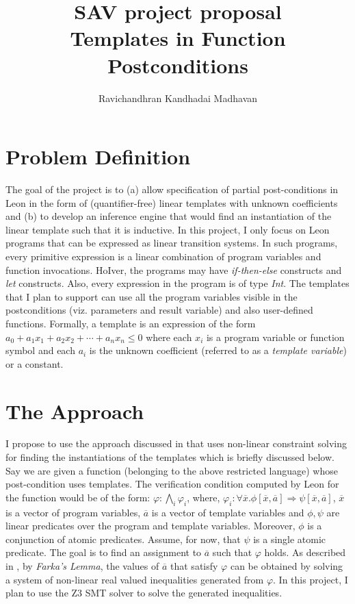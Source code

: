 \documentclass[a4paper,10pt]{article}
\begin{document}
\title{SAV project proposal \\ Templates in Function Postconditions}
\author{Ravichandhran Kandhadai Madhavan}
\maketitle

\newcommand{\dash}[1]{\overline{#1}}

\section{Problem Definition}

The goal of the project is to (a) allow specification of partial post-conditions in Leon in the form of (quantifier-free) linear templates with unknown coefficients and (b) to develop an inference engine that would find an instantiation of the linear template such that it is inductive. In this project, I only focus on Leon programs that can be expressed as linear transition systems. In such programs, every primitive expression is a linear combination of program variables and function invocations. HoIver, the programs may have \textit{if-then-else} constructs and \textit{let} constructs. Also, every expression in the program is of type \textit{Int}.
The templates that I plan to support can use all the program variables visible in the postconditions (viz. parameters and result variable) and also user-defined functions.
 Formally, a template is an expression of the form $a_0 + a_1x_1 + a_2x_2 + \cdots + a_nx_n \le 0$ where each $x_i$ is a program variable or function symbol and each $a_i$ is the unknown coefficient (referred to as a \textit{template variable}) or a constant.

\section{The Approach}

I propose to use the approach discussed in \cite{ssriram:CAV03} that uses non-linear constraint solving for finding the instantiations of the templates which is briefly discussed below. Say we are given a function (belonging to the above restricted language) whose post-condition uses templates. The verification condition computed by Leon for the function would be of the form:
$\varphi: \bigwedge_i \varphi_i$, where,
$\mathit{\varphi_i: } \forall \dash{x}. \phi[\dash{x},\dash{a}] \Rightarrow \psi[\dash{x},\dash{a}]$, $\dash{x}$ is a vector of program variables, $\dash{a}$ is a vector of template variables and $\phi, \psi$ are linear predicates over the program and template variables. Moreover, $\phi$ is a conjunction of atomic predicates. Assume, for now, that $\psi$ is a single atomic predicate.
The goal is to find an assignment to $\dash{a}$ such that $\varphi$ holds.
As described in \cite{ssriram:CAV03}, by \textit{Farka's Lemma}, the values of $\dash{a}$ that satisfy $\varphi$ can be obtained by solving a system of non-linear real valued inequalities generated from $\varphi$. 
In this project, I plan to use the Z3 SMT solver to solve the generated inequalities. 
\end{document}
